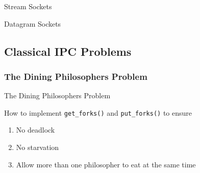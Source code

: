 \begin{frame}{Stream Sockets}
  \centering
  \mode<beamer>{ \texttt{[image: socket-stream]} }%
\end{frame}

\begin{frame}{Datagram Sockets}
  \centering
  \mode<beamer>{ \texttt{[image: socket-datagram]} }%
\end{frame}

\subsection{Classical IPC Problems}
\label{sec:class-ipc-probl}

\subsubsection{The Dining Philosophers Problem}
\label{sec:dining-phil-probl}

\begin{frame}{The Dining Philosophers Problem}
  \begin{center}
    \begin{minipage}{.49\linewidth}
    \end{minipage} \hfill
    \begin{minipage}{.49\linewidth}
    \end{minipage}
  \end{center}
  
  How to implement \texttt{get\_forks()} and \texttt{put\_forks()} to ensure
  \begin{enumerate}
  \item No deadlock
  \item No starvation
  \item Allow more than one philosopher to eat at the same time
  \end{enumerate}
\end{frame}

